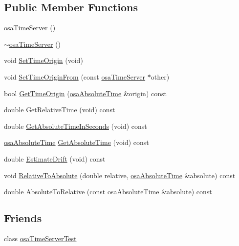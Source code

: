 \subsection*{Public Member Functions}
\begin{DoxyCompactItemize}
\item 
\hyperlink{classosa_time_server_a2025b74de2c3114ddc29187c660038e4}{osa\+Time\+Server} ()
\item 
\hyperlink{classosa_time_server_aff5e7e7d548f61b52f0892e67b302539}{$\sim$osa\+Time\+Server} ()
\item 
void \hyperlink{classosa_time_server_afac2aebe744ae87dc8666c79ce86fae3}{Set\+Time\+Origin} (void)
\item 
void \hyperlink{classosa_time_server_a02158dcb3a8e7cef7e816d53c03e1ffc}{Set\+Time\+Origin\+From} (const \hyperlink{classosa_time_server}{osa\+Time\+Server} $\ast$other)
\item 
bool \hyperlink{classosa_time_server_a8cf91b6ce8714f4b2bfa68437e182355}{Get\+Time\+Origin} (\hyperlink{structosa_absolute_time}{osa\+Absolute\+Time} \&origin) const 
\item 
double \hyperlink{classosa_time_server_a9c0a681ef88f4391d883be21ce8ed6bd}{Get\+Relative\+Time} (void) const 
\item 
double \hyperlink{classosa_time_server_a00e1277d460d21ca0c90ade821d11a84}{Get\+Absolute\+Time\+In\+Seconds} (void) const 
\item 
\hyperlink{structosa_absolute_time}{osa\+Absolute\+Time} \hyperlink{classosa_time_server_a2656918bbf5d6c4b2746d6957c0bd8fc}{Get\+Absolute\+Time} (void) const 
\item 
double \hyperlink{classosa_time_server_aabc695f2895828c46d1b2713dc668aa4}{Estimate\+Drift} (void) const 
\item 
void \hyperlink{classosa_time_server_a2cedc54dd23cb60605eb6207aea9129b}{Relative\+To\+Absolute} (double relative, \hyperlink{structosa_absolute_time}{osa\+Absolute\+Time} \&absolute) const 
\item 
double \hyperlink{classosa_time_server_a502141b5545d6cfc025d91ca3dfa5a29}{Absolute\+To\+Relative} (const \hyperlink{structosa_absolute_time}{osa\+Absolute\+Time} \&absolute) const 
\end{DoxyCompactItemize}
\subsection*{Friends}
\begin{DoxyCompactItemize}
\item 
class \hyperlink{classosa_time_server_a973e8a021d390521eba93b2dd9fcb557}{osa\+Time\+Server\+Test}
\end{DoxyCompactItemize}


